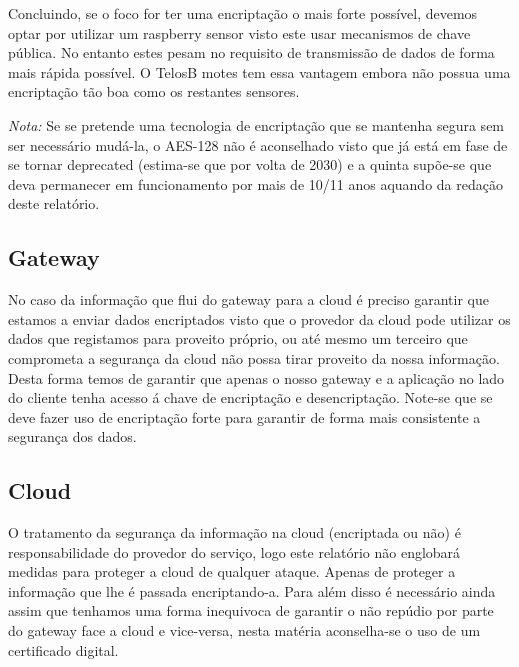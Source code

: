 \par Concluindo, se o foco for ter uma encriptação o mais forte possível, devemos optar por utilizar um raspberry sensor visto este usar mecanismos de chave pública. No entanto estes pesam no requisito de transmissão de dados de forma mais rápida possível. O TelosB motes tem essa vantagem embora não possua uma encriptação tão boa como os restantes sensores.\newline


\textit{Nota:} Se se pretende uma tecnologia de encriptação que se mantenha segura sem ser necessário mudá-la, o AES-128 não é aconselhado visto que já está em fase de se tornar deprecated (estima-se que por volta de 2030) e a quinta supõe-se que deva permanecer em funcionamento por mais de 10/11 anos aquando da redação deste relatório.\newline



\subsection{Gateway}
\par\hfill
\par No caso da informação que flui do gateway para a cloud é preciso garantir que estamos a enviar dados encriptados visto que o provedor da cloud pode utilizar os dados que registamos para proveito próprio, ou até mesmo um terceiro que comprometa a segurança da cloud não possa tirar proveito da nossa informação. Desta forma temos de garantir que apenas o nosso gateway e a aplicação no lado do cliente tenha acesso á chave de encriptação e desencriptação. Note-se que se deve fazer uso de encriptação forte para garantir de forma mais consistente a segurança dos dados.\newline

\subsection{Cloud}
\par\hfill
\par O tratamento da segurança da informação na cloud (encriptada ou não) é responsabilidade do provedor do serviço, logo este relatório não englobará medidas para proteger a cloud de qualquer ataque. Apenas de proteger a informação que lhe é passada encriptando-a.\newline
Para além disso é necessário ainda assim que tenhamos uma forma inequivoca de garantir o não repúdio por parte do gateway face a cloud e vice-versa, nesta matéria aconselha-se o uso de um certificado digital.\newline 
